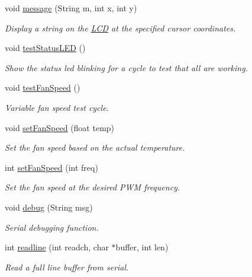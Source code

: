\begin{DoxyCompactItemize}
void \hyperlink{_meditech___chip_kit_control_panel_8pde_ae1956b5b6310b3339e72931911b84e3f}{message} (String m, int x, int y)
\begin{DoxyCompactList}\small\item\em Display a string on the \hyperlink{class_l_c_d}{L\-C\-D} at the specified cursor coordinates. \end{DoxyCompactList}\item 
void \hyperlink{_meditech___chip_kit_control_panel_8pde_af1a6bbf84a5ea76623bdc49aaf642a28}{test\-Status\-L\-E\-D} ()
\begin{DoxyCompactList}\small\item\em Show the status led blinking for a cycle to test that all are working. \end{DoxyCompactList}\item 
void \hyperlink{_meditech___chip_kit_control_panel_8pde_a697689ffa626676db9a1abb5e6662762}{test\-Fan\-Speed} ()
\begin{DoxyCompactList}\small\item\em Variable fan speed test cycle. \end{DoxyCompactList}\item 
void \hyperlink{_meditech___chip_kit_control_panel_8pde_ac0f1975168c58bd48fc29f8e3004a5a8}{set\-Fan\-Speed} (float temp)
\begin{DoxyCompactList}\small\item\em Set the fan speed based on the actual temperature. \end{DoxyCompactList}\item 
int \hyperlink{_meditech___chip_kit_control_panel_8pde_aac6d40e9f46456f3b2d16f2fe64004cc}{set\-Fan\-Speed} (int freq)
\begin{DoxyCompactList}\small\item\em Set the fan speed at the desired P\-W\-M frequency. \end{DoxyCompactList}\item 
void \hyperlink{_meditech___chip_kit_control_panel_8pde_ad5b3677e61ca769d9d9e5cf9cfa1b33c}{debug} (String msg)
\begin{DoxyCompactList}\small\item\em Serial debugging function. \end{DoxyCompactList}\item 
int \hyperlink{_meditech___chip_kit_control_panel_8pde_ad425a899bc1884bbf9a24d56ba4d6f53}{readline} (int readch, char $\ast$buffer, int len)
\begin{DoxyCompactList}\small\item\em Read a full line buffer from serial. \end{DoxyCompactList}\item 

\end{DoxyCompactItemize}
